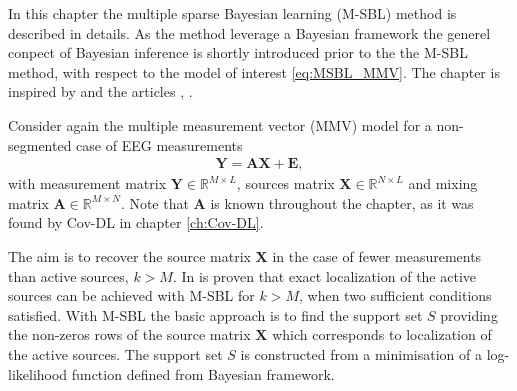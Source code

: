 In this chapter the multiple sparse Bayesian learning (M-SBL) method is described in details. As the method leverage a Bayesian framework the generel conpect of Bayesian inference is shortly introduced prior to the the M-SBL method, with respect to the model of interest \eqref{eq:MSBL_MMV}. The chapter is inspired by \cite{phd_wipf} and the articles \cite{article_wipf}, \cite{Balkan2014}.

Consider again the multiple measurement vector (MMV) model for a non-segmented case of EEG measurements
\begin{align}\label{eq:MSBL_MMV}
\mathbf{Y} = \mathbf{AX} + \mathbf{E},
\end{align}
with measurement matrix $\mathbf{Y} \in \mathbb{R}^{M \times L}$, sources matrix $\mathbf{X} \in \mathbb{R}^{N \times L}$ and mixing matrix $\mathbf{A} \in \mathbb{R}^{M \times N}$. Note that $\textbf{A}$ is known throughout the chapter, as it was found by Cov-DL in chapter \ref{ch:Cov-DL}. 

The aim is to recover the source matrix $\mathbf{X}$ in the case of fewer measurements than active sources, $k > M$. 
In \cite{Balkan2014} is proven that exact localization of the active sources can be achieved with M-SBL for $k > M$, when two sufficient conditions satisfied.   
With M-SBL the basic approach is to find the support set $S$ providing the non-zeros rows of the source matrix $\mathbf{X}$ which corresponds to localization of the active sources. 
The support set $S$ is constructed from a minimisation of a log-likelihood function defined from Bayesian framework.

